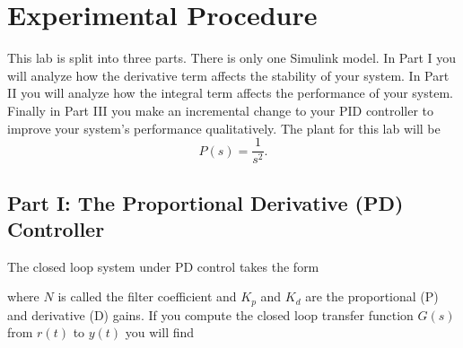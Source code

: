 \section{Experimental Procedure}\label{Lab:4:Experiment}
This lab is split into three parts.
There is only one Simulink model.
In Part I you will analyze how the derivative term affects the stability of your system.
In Part II you will analyze how the integral term affects the performance of your system.
Finally in Part III you make an incremental change to your PID controller to improve your system's performance qualitatively.
The plant for this lab will be
\[
  P(s) = \frac{1}{s^2}.
\]

\subsection{Part I: The Proportional Derivative (PD) Controller}
The closed loop system under PD control takes the form
%
\begin{center}
\end{center}
where \(N\) is called the filter coefficient and \(K_p\) and \(K_d\) are the proportional (P) and derivative (D) gains.
If you compute the closed loop transfer function \(G(s)\) from \(r(t)\) to \(y(t)\) you will find
